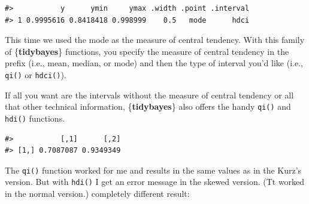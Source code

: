 \documentclass[
  letterpaper,
  DIV=11,
  numbers=noendperiod]{scrreprt}
\newenvironment{Shaded}{\begin{snugshade}}{\end{snugshade}}
\newcommand{\AttributeTok}[1]{\textcolor[rgb]{0.40,0.45,0.13}{#1}}
\newcommand{\CommentTok}[1]{\textcolor[rgb]{0.37,0.37,0.37}{#1}}
\newcommand{\ConstantTok}[1]{\textcolor[rgb]{0.56,0.35,0.01}{#1}}
\newcommand{\DecValTok}[1]{\textcolor[rgb]{0.68,0.00,0.00}{#1}}
\newcommand{\FunctionTok}[1]{\textcolor[rgb]{0.28,0.35,0.67}{#1}}
\newcommand{\InformationTok}[1]{\textcolor[rgb]{0.37,0.37,0.37}{#1}}
\newcommand{\NormalTok}[1]{\textcolor[rgb]{0.00,0.23,0.31}{#1}}
\newcommand{\SpecialCharTok}[1]{\textcolor[rgb]{0.37,0.37,0.37}{#1}}
\begin{document}
\begin{verbatim}
#>           y      ymin     ymax .width .point .interval
#> 1 0.9995616 0.8418418 0.998999    0.5   mode      hdci
\end{verbatim}

This time we used the mode as the measure of central tendency. With this
family of \{\textbf{tidybayes}\} functions, you specify the measure of
central tendency in the prefix (i.e., mean, median, or mode) and then
the type of interval you'd like (i.e., \texttt{qi()} or
\texttt{hdci()}).

If all you want are the intervals without the measure of central
tendency or all that other technical information, \{\textbf{tidybayes}\}
also offers the handy \texttt{qi()} and \texttt{hdi()} functions.

\begin{Shaded}
\end{Shaded}

\begin{verbatim}
#>           [,1]      [,2]
#> [1,] 0.7087087 0.9349349
\end{verbatim}

The \texttt{qi()} function worked for me and results in the same values
as in the Kurz's version. But with \texttt{hdi()} I get an error message
in the skewed version. (Tt worked in the normal version.) completely
different result:

\begin{Shaded}
\end{Shaded}
\end{document}
